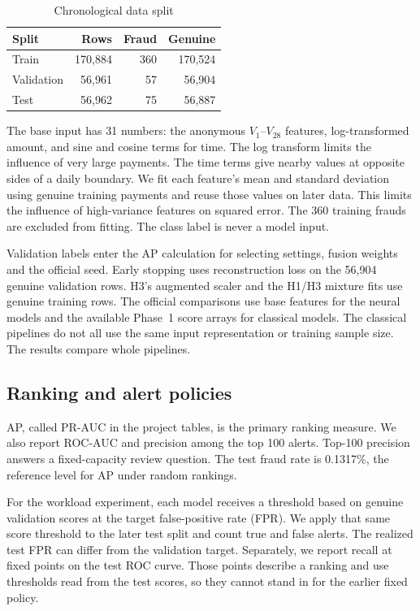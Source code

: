 \begin{table}[t]
\centering
\caption{Chronological data split}
\label{tab:splits}
\begin{tabular}{lrrr}
\toprule
Split & Rows & Fraud & Genuine \\
\midrule
Train & 170,884 & 360 & 170,524 \\
Validation & 56,961 & 57 & 56,904 \\
Test & 56,962 & 75 & 56,887 \\
\bottomrule
\end{tabular}
\end{table}

The base input has 31 numbers: the anonymous $V_1$--$V_{28}$ features, log-transformed amount, and sine and cosine terms for time. The log transform limits the influence of very large payments. The time terms give nearby values at opposite sides of a daily boundary. We fit each feature's mean and standard deviation using genuine training payments and reuse those values on later data. This limits the influence of high-variance features on squared error. The 360 training frauds are excluded from fitting. The class label is never a model input.

Validation labels enter the AP calculation for selecting settings, fusion weights and the official seed. Early stopping uses reconstruction loss on the 56,904 genuine validation rows. H3's augmented scaler and the H1/H3 mixture fits use genuine training rows. The official comparisons use base features for the neural models and the available Phase~1 score arrays for classical models. The classical pipelines do not all use the same input representation or training sample size. The results compare whole pipelines.

\subsection{Ranking and alert policies}
AP, called PR-AUC in the project tables, is the primary ranking measure. We also report ROC-AUC and precision among the top 100 alerts. Top-100 precision answers a fixed-capacity review question. The test fraud rate is 0.1317\%, the reference level for AP under random rankings.

For the workload experiment, each model receives a threshold based on genuine validation scores at the target false-positive rate (FPR). We apply that same score threshold to the later test split and count true and false alerts. The realized test FPR can differ from the validation target. Separately, we report recall at fixed points on the test ROC curve. Those points describe a ranking and use thresholds read from the test scores, so they cannot stand in for the earlier fixed policy.

